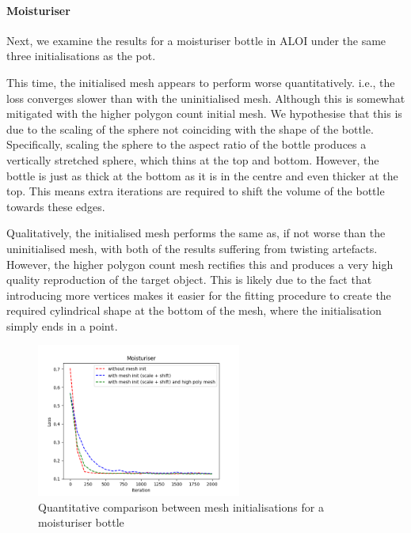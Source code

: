 \documentclass{article}
\begin{document}
\newpage
\paragraph{Moisturiser}
Next, we examine the results for a moisturiser bottle in ALOI under the same three initialisations as the pot.

This time, the initialised mesh appears to perform worse quantitatively. i.e., the loss converges slower than with the uninitialised mesh. Although this is somewhat mitigated with the higher polygon count initial mesh. We hypothesise that this is due to the scaling of the sphere not coinciding with the shape of the bottle. Specifically, scaling the sphere to the aspect ratio of the bottle produces a vertically stretched sphere, which thins at the top and bottom. However, the bottle is just as thick at the bottom as it is in the centre and even thicker at the top. This means extra iterations are required to shift the volume of the bottle towards these edges.

Qualitatively, the initialised mesh performs the same as, if not worse than the uninitialised mesh, with both of the results suffering from twisting artefacts. However, the higher polygon count mesh rectifies this and produces a very high quality reproduction of the target object. This is likely due to the fact that introducing more vertices makes it easier for the fitting procedure to create the required cylindrical shape at the bottom of the mesh, where the initialisation simply ends in a point.

\begin{figure}[h!]
  \centering
  \includegraphics[width=0.6\textwidth]{images/moisturiserplot.png}
  \caption{Quantitative comparison between mesh initialisations for a moisturiser bottle}
  \label{results-moisturiser-loss}
\end{figure}
\end{document}
